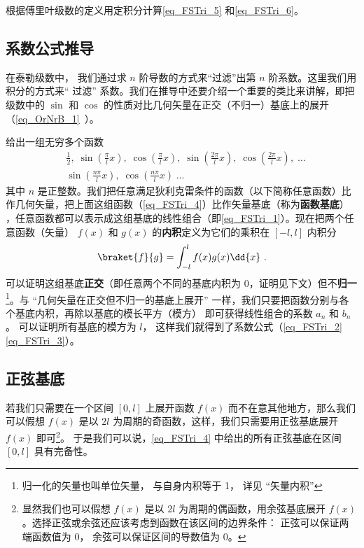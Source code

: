 \begin{exercise}{}
根据傅里叶级数的定义用定积分计算\autoref{eq_FSTri_5} 和\autoref{eq_FSTri_6}。
\end{exercise}

\subsection{系数公式推导}

在泰勒级数中，%
我们通过求 $n$ 阶导数的方式来“过滤”出第 $n$ 阶系数。这里我们用积分的方式来“ 过滤” 系数。我们在推导中还要介绍一个重要的类比来讲解，即把级数中的 $\sin$ 和 $\cos$ 的性质对比几何矢量在正交（不归一）基底上的展开（\autoref{eq_OrNrB_1}~）。

% 

给出一组无穷多个函数
\begin{equation}\label{eq_FSTri_4}
\begin{aligned}
&\frac12,\;   \sin(\frac{\pi}{l} x),\;   \cos(\frac{\pi}{l} x),\;   \sin(\frac{2\pi}{l} x),\;   \cos(\frac{2\pi}{l} x),\;   \dots\\
&\sin(\frac{n\pi}{l} x),\;   \cos(\frac{n\pi}{l} x)\;   \dots
\end{aligned}\end{equation}
其中 $n$ 是正整数。我们把任意满足狄利克雷条件的函数（以下简称任意函数）比作几何矢量，把上面这组函数（\autoref{eq_FSTri_4}）比作矢量基底（称为\textbf{函数基底}）
，任意函数都可以表示成这组基底的线性组合（即\autoref{eq_FSTri_1}）。现在把两个任意函数（矢量） $f(x)$ 和 $g(x)$ 的\textbf{内积}定义为它们的乘积在 $[-l,l]$ 内积分
\begin{equation}
\braket{f}{g} = \int_{-l}^{l} f(x) g(x) \dd{x}~.
\end{equation}
可以证明这组基底\textbf{正交}（即任意两个不同的基底内积为 0，证明见下文）但不\textbf{归一}\footnote{归一化的矢量也叫单位矢量， 与自身内积等于 1， 详见 “矢量内积”}。与 “几何矢量在正交但不归一的基底上展开” 一样，我们只要把函数分别与各个基底内积，再除以基底的模长平方（模方）
即可获得线性组合的系数 $a_n$ 和 $b_n$。 可以证明所有基底的模方为 $l$， 这样我们就得到了系数公式（\autoref{eq_FSTri_2} \autoref{eq_FSTri_3}）。


\subsection{正弦基底}\label{sub_FSTri_3}
若我们只需要在一个区间 $[0,l]$ 上展开函数 $f(x)$ 而不在意其他地方，那么我们可以假想 $f(x)$ 是以 $2l$ 为周期的奇函数，这样，我们只需要用正弦基底展开 $f(x)$ 即可\footnote{显然我们也可以假想 $f(x)$ 是以 $2l$ 为周期的偶函数，用余弦基底展开 $f(x)$。选择正弦或余弦还应该考虑到函数在该区间的边界条件： 正弦可以保证两端函数值为 0， 余弦可以保证区间的导数值为 0。}。 于是我们可以说，\autoref{eq_FSTri_4} 中给出的所有正弦基底在区间 $[0,l]$ 具有完备性。

